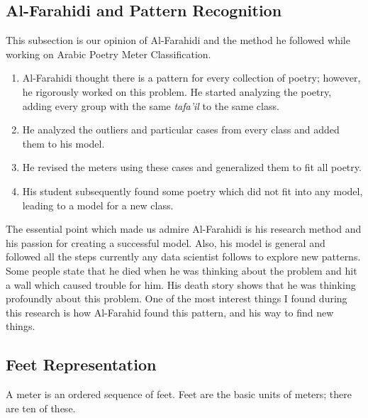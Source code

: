\subsection{Al-Farahidi and Pattern Recognition}

This subsection is our opinion of Al-Farahidi and the method he followed while working on Arabic Poetry Meter Classification.

\begin{enumerate}
  \item Al-Farahidi thought there is a pattern for every collection of poetry; however, he rigorously worked on this problem. He started analyzing the poetry, adding every group with the same \textit{tafa'il} to the same class.
  \item He analyzed the outliers and particular cases from every class and added them to his model.
  \item He revised the meters using these cases and generalized them to fit all poetry.
  \item His student subsequently found some poetry which did not fit into any model, leading to a model for a new class.
\end{enumerate}

The essential point which made us admire Al-Farahidi is his research method and his passion for creating a successful model. Also, his model is general and followed all the steps currently any data scientist follows to explore new patterns. Some people state that he died when he was thinking about the problem and hit a wall which caused trouble for him. His death story shows that he was thinking profoundly about this problem. One of the most interest things I found during this research is how Al-Farahid found this pattern, and his way to find new things.

\subsection{Feet Representation}
A meter is an ordered sequence of feet. Feet are the basic units of meters; there are ten of these.

